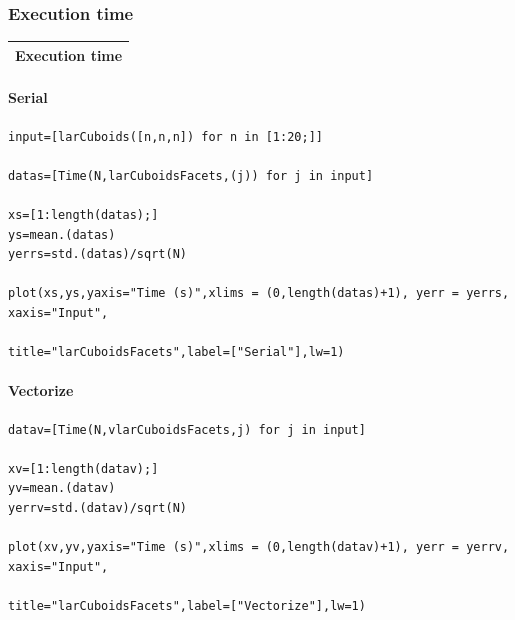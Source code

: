 \documentclass{article}
\begin{document}
\subsubsection{Execution time}
\begin{center}
\begin{tabular}{|p{16cm}|}
\hline
\cellcolor[gray]{.9}Execution time\\
\hline
\end{tabular}
\end{center}

\paragraph{Serial}
\begin{flushleft}\small
\begin{list}{}{} \item
    \begin{Verbatim}[tabsize=4]
input=[larCuboids([n,n,n]) for n in [1:20;]]

datas=[Time(N,larCuboidsFacets,(j)) for j in input]

xs=[1:length(datas);]
ys=mean.(datas)
yerrs=std.(datas)/sqrt(N)

plot(xs,ys,yaxis="Time (s)",xlims = (0,length(datas)+1), yerr = yerrs, xaxis="Input",
                                            title="larCuboidsFacets",label=["Serial"],lw=1)
    \end{Verbatim}
\end{list}
\end{flushleft}  

\paragraph{Vectorize}
\begin{flushleft}\small
\begin{list}{}{} \item
    \begin{Verbatim}[tabsize=4]
datav=[Time(N,vlarCuboidsFacets,j) for j in input]

xv=[1:length(datav);]
yv=mean.(datav)
yerrv=std.(datav)/sqrt(N)

plot(xv,yv,yaxis="Time (s)",xlims = (0,length(datav)+1), yerr = yerrv, xaxis="Input",   
                                        title="larCuboidsFacets",label=["Vectorize"],lw=1)
    \end{Verbatim}
\end{list}
\end{flushleft}
\end{document}

